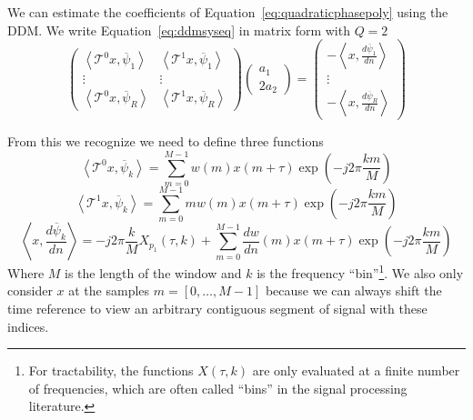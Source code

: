 We can estimate the coefficients of Equation~\ref{eq:quadraticphasepoly} using
the DDM. We write Equation~\ref{eq:ddmsyseq} in matrix form with $Q=2$
\[
    \begin{pmatrix}
        \left\langle \mathcal{T}^{0} x , \overline{\psi}_{1} \right\rangle &
        \left\langle \mathcal{T}^{1} x , \overline{\psi}_{1} \right\rangle \\
        \vdots & \vdots \\
        \left\langle \mathcal{T}^{0} x , \overline{\psi}_{R} \right\rangle & 
        \left\langle \mathcal{T}^{1} x , \overline{\psi}_{R} \right\rangle
    \end{pmatrix}
    \begin{pmatrix}
        a_{1} \\
        2a_{2}
    \end{pmatrix}
    =
    \begin{pmatrix}
        -\left\langle  x , \frac{d\overline{\psi}_{1}}{dn} \right\rangle \\
        \vdots \\
        -\left\langle  x , \frac{d\overline{\psi}_{R}}{dn} \right\rangle
    \end{pmatrix}
\]

From this we recognize we need to define three functions
\[
    \left\langle \mathcal{T}^{0} x , \overline{\psi}_{k} \right\rangle 
    =
    \sum_{m=0}^{M-1} w(m) x(m + \tau) \exp(-j 2 \pi \frac{k m}{M})
\]
\[
    \left\langle \mathcal{T}^{1} x , \overline{\psi}_{k} \right\rangle
    =
    \sum_{m=0}^{M-1} m w(m) x(m + \tau) \exp(-j 2 \pi \frac{k m}{M})
\]
\[
    \left\langle  x , \frac{d\overline{\psi}_{k}}{dn} \right\rangle
    =
    -j 2 \pi \frac{k}{M} X_{p_{1}} \left( \tau , k \right) + 
    \sum_{m=0}^{M-1} \frac{dw}{dn}(m) x(m + \tau) \exp(-j 2 \pi \frac{k m}{M})
\]
Where $M$ is the length of the window and $k$ is the frequency
``bin''\footnote{For tractability, the functions $X(\tau,k)$ are only evaluated at
    a finite number of frequencies, which are often called ``bins'' in the
signal processing literature.}. We also
only consider $x$ at the samples $m = [0, \dotsc, M-1]$ because we can always
shift the time reference to view an arbitrary contiguous segment of signal with
these indices.

